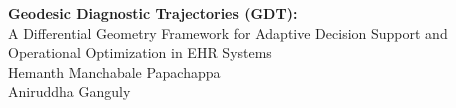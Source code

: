 \documentclass[11pt]{article}
\begin{document}
\thispagestyle{empty}
\begin{center}
{\LARGE \textbf{Geodesic Diagnostic Trajectories (GDT):}\\[0.5em]
A Differential Geometry Framework for Adaptive Decision Support and Operational Optimization in EHR Systems}\\[2em]

{\large Hemanth Manchabale Papachappa \\ Aniruddha Ganguly}\\[3em]

\end{center}
\end{document}
